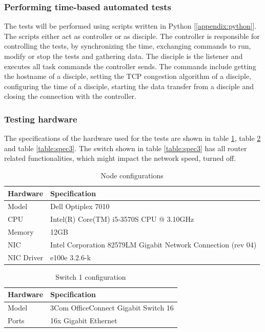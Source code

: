 \documentclass{article}
\begin{document}
		\subsubsection{Performing time-based automated tests}
		The tests will be performed using scripts written in Python [\ref{appendix:python}]. The scripts either act as controller or as disciple. The controller is responsible for controlling the tests, by synchronizing the time, exchanging commands to run, modify or stop the tests and gathering data. The disciple is the listener and executes all task commands the controller sends. The commands include getting the hostname of a disciple, setting the TCP congestion algorithm of a disciple, configuring the time of a disciple, starting the data transfer from a disciple and closing the connection with the controller.

		\subsubsection{Testing hardware}
		The specifications of the hardware used for the tests are shown in table \ref{table:spec1}, table \ref{table:spec2} and table \ref{table:spec3}. The switch shown in table \ref{table:spec3} has all router related functionalities, which might impact the network speed, turned off.

		\begin{table}[H]
			\centering
			\caption{Node configurations}
			\begin{tabular}[H]{ | l | l | }
			\hline
			\textbf{Hardware} & \textbf{Specification} \\
			\hline  Model & Dell Optiplex 7010\\
			\hline  CPU & Intel(R) Core(TM) i5-3570S CPU @ 3.10GHz\\
			\hline  Memory & 12GB\\
			\hline  NIC & Intel Corporation 82579LM Gigabit Network Connection (rev 04)\\
			\hline	NIC Driver & e100e 3.2.6-k\\
			\hline
			\end{tabular}
			\label{table:spec1}
		\end{table}

		\begin{table}[H]
			\centering
			\caption{Switch 1 configuration}
			\begin{tabular}[H]{ | l | l | }
			\hline
			\textbf{Hardware} & \textbf{Specification} \\
			\hline  Model & 3Com OfficeConnect Gigabit Switch 16\\
			\hline  Ports & 16x Gigabit Ethernet\\
			\hline
			\end{tabular}
			\label{table:spec2}
		\end{table}
		
\end{document}

